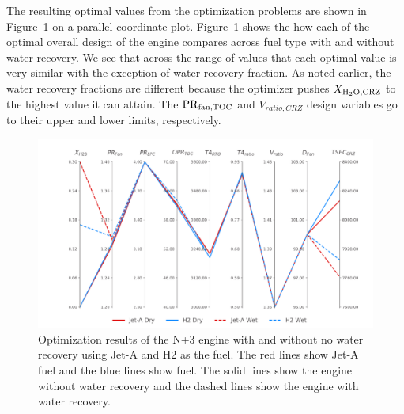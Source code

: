 \documentclass[conf]{new-aiaa}
\begin{document}
The resulting optimal values from the optimization problems are shown in Figure~\ref{fig:parallel_coords} on a parallel coordinate plot.
Figure~\ref{fig:parallel_coords} shows the how each of the optimal overall design of the engine compares across fuel type with and without water recovery.
We see that across the range of values that each optimal value is very similar with the exception of water recovery fraction.
As noted earlier, the water recovery fractions are different because the optimizer pushes $X_{\rm{{H_2O},CRZ}}$ to the highest value it can attain.
The $\rm{PR}_{fan,TOC}$ and $V_{ratio,CRZ}$ design variables go to their upper and lower limits, respectively.

\begin{figure}[hbt!]
    \centering
    \includegraphics[width=1.0\textwidth]{N3_parallel_coords.pdf}
    \caption{Optimization results of the N+3 engine with and without no water recovery using Jet-A and H2 as the fuel.
        The red lines show Jet-A fuel and the blue lines show  fuel.
        The solid lines show the engine without water recovery and the dashed lines show the engine with water recovery.}
    \label{fig:parallel_coords}
\end{figure}
\end{document}

